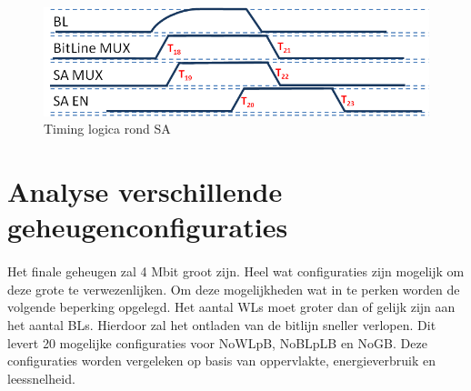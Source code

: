 \begin{figure}[!ht]
  \centering
  \includegraphics[scale=0.9]{../fig/hfdstk-timing-sa2.png}
  \caption{Timing logica rond SA}
  \label{fig:sa_timing2}
\end{figure}

\section{Analyse verschillende geheugenconfiguraties}
\paragraph{}
Het finale geheugen zal 4 Mbit groot zijn. Heel wat configuraties zijn mogelijk om deze grote te verwezenlijken. Om deze mogelijkheden wat in te perken worden de volgende beperking opgelegd. Het aantal WLs moet groter dan of gelijk zijn aan het aantal BLs. Hierdoor zal het ontladen van de bitlijn sneller verlopen. Dit levert 20 mogelijke configuraties voor NoWLpB, NoBLpLB en NoGB. Deze configuraties worden vergeleken op basis van oppervlakte, energieverbruik en leessnelheid. 

